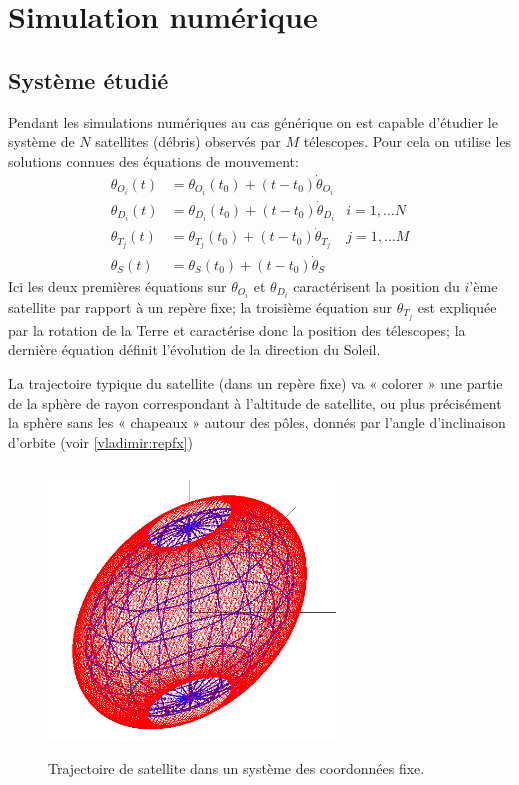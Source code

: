 
\section{Simulation num\'erique}

\subsection{Syst\`eme \'etudi\'e}
Pendant les simulations num\'eriques au cas g\'en\'erique on est capable 
d'\'etudier le syst\`eme de $N$ satellites (d\'ebris) observ\'es par $M$
t\'elescopes. Pour cela on utilise les solutions connues des \'equations 
de mouvement: 
\begin{align}
   \theta_{O_i}(t) &= \theta_{O_i}(t_0) + (t-t_0)\dot \theta_{O_i} &  \nonumber \\
   \theta_{D_i}(t) &= \theta_{D_i}(t_0) + (t-t_0)\dot \theta_{D_i}  & i = 1, \dots N \label{vladimir:sat} \\
   \theta_{T_j}(t) &= \theta_{T_j}(t_0) + (t-t_0)\dot \theta_{T_j} & j = 1, \dots M \label{vladimir:tel} \\
   \theta_S(t) &= \theta_S(t_0) +  (t-t_0)\dot\theta_S  &\label{vladimir:sun} 
\end{align}
Ici les deux premi\`eres \'equations sur $\theta_{O_i}$ et
$\theta_{D_i}$ caract\'erisent la position du $i$'\`eme satellite par
rapport \`a un rep\`ere fixe; la troisi\`eme \'equation sur
$\theta_{T_j}$ est expliqu\'ee par la rotation de la Terre et
caract\'erise donc la position des t\'elescopes; la derni\`ere
\'equation d\'efinit l'évolution de la direction du Soleil.

La trajectoire typique du satellite (dans un rep\`ere fixe) va « colorer » une partie de
la sph\`ere de rayon correspondant \`a l'altitude de satellite, ou plus pr\'ecis\'ement la sph\`ere
sans les « chapeaux » autour des p\^oles, donn\'es par l'angle d'inclinaison d'orbite
(voir \autoref{vladimir:repfx})
 \begin{figure}[htp] \centering
     \includegraphics*[width=3in, height=3in]{repfx.png}
      \caption{
            \label{vladimir:repfx}
Trajectoire de satellite dans un syst\`eme des coordonn\'ees fixe. }
 \end{figure}

